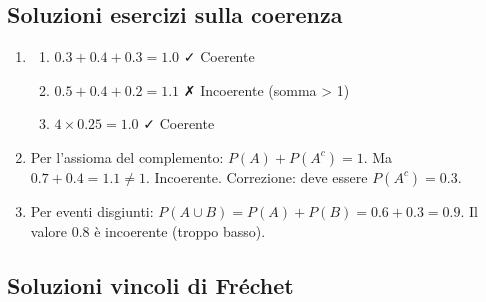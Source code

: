 \documentclass[
  letterpaper,
  DIV=11,
  numbers=noendperiod,
  oneside]{scrreprt}
\providecommand{\tightlist}{%
  \setlength{\itemsep}{0pt}\setlength{\parskip}{0pt}}
\theoremstyle{definition}
\theoremstyle{plain}
\theoremstyle{definition}
\theoremstyle{remark}
\begin{document}
\begin{tcolorbox}[enhanced jigsaw, arc=.35mm, breakable, colbacktitle=quarto-callout-tip-color!10!white, opacityback=0, toprule=.15mm, rightrule=.15mm, colback=white, opacitybacktitle=0.6, leftrule=.75mm, coltitle=black, bottomtitle=1mm, left=2mm, toptitle=1mm, title=\textcolor{quarto-callout-tip-color}{\faLightbulb}\hspace{0.5em}{Soluzioni}, titlerule=0mm, bottomrule=.15mm, colframe=quarto-callout-tip-color-frame]

\subsection{Soluzioni esercizi sulla
coerenza}\label{soluzioni-esercizi-sulla-coerenza}

\begin{enumerate}
\def\labelenumi{\arabic{enumi}.}
\item
  \begin{enumerate}
  \def\labelenumii{\alph{enumii}.}
  \tightlist
  \item
    \(0.3 + 0.4 + 0.3 = 1.0\) ✓ Coerente\\
  \item
    \(0.5 + 0.4 + 0.2 = 1.1\) ✗ Incoerente (somma \textgreater{} 1)\\
  \item
    \(4 \times 0.25 = 1.0\) ✓ Coerente
  \end{enumerate}
\item
  Per l'assioma del complemento: \(P(A) + P(A^c) = 1\). Ma
  \(0.7 + 0.4 = 1.1 \neq 1\). Incoerente. Correzione: deve essere
  \(P(A^c) = 0.3\).
\item
  Per eventi disgiunti: \(P(A \cup B) = P(A) + P(B) = 0.6 + 0.3 = 0.9\).
  Il valore 0.8 è incoerente (troppo basso).
\end{enumerate}

\subsection{Soluzioni vincoli di
Fréchet}\label{soluzioni-vincoli-di-fruxe9chet}


\end{tcolorbox}
\end{document}
